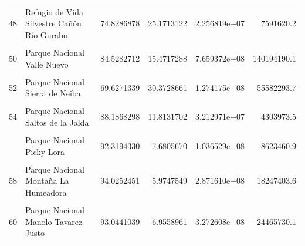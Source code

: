 \documentclass[10pt,landscape,a3paper]{article}
\begin{document}
\begin{longtable}[t]{llrrrr}
48 & Refugio de Vida Silvestre Cañón Río Gurabo & 74.8286878 & 25.1713122 & 2.256819e+07 & 7591620.2\\
\cellcolor{lightgray}{49} & \cellcolor{lightgray}{Refugio de Vida Silvestre Bahia de Luperón} & \cellcolor{lightgray}{43.6916900} & \cellcolor{lightgray}{56.3083100} & \cellcolor{lightgray}{8.163662e+06} & \cellcolor{lightgray}{10521039.6}\\
50 & Parque Nacional Valle Nuevo & 84.5282712 & 15.4717288 & 7.659372e+08 & 140194190.1\\
\addlinespace
\cellcolor{lightgray}{51} & \cellcolor{lightgray}{Parque Nacional Sierra Martín García} & \cellcolor{lightgray}{72.8168067} & \cellcolor{lightgray}{27.1831933} & \cellcolor{lightgray}{1.904179e+08} & \cellcolor{lightgray}{71084794.4}\\
52 & Parque Nacional Sierra de Neiba & 69.6271339 & 30.3728661 & 1.274175e+08 & 55582293.7\\
\cellcolor{lightgray}{53} & \cellcolor{lightgray}{Parque Nacional Sierra de Bahoruco} & \cellcolor{lightgray}{88.1011026} & \cellcolor{lightgray}{11.8988974} & \cellcolor{lightgray}{9.623023e+08} & \cellcolor{lightgray}{129968135.2}\\
54 & Parque Nacional Saltos de la Jalda & 88.1868298 & 11.8131702 & 3.212971e+07 & 4303973.5\\
\cellcolor{lightgray}{55} & \cellcolor{lightgray}{Parque Nacional Punta Espada} & \cellcolor{lightgray}{49.9096730} & \cellcolor{lightgray}{50.0903270} & \cellcolor{lightgray}{4.104462e+07} & \cellcolor{lightgray}{41193188.6}\\
\addlinespace
56 & Parque Nacional Picky Lora & 92.3194330 & 7.6805670 & 1.036529e+08 & 8623460.9\\
\cellcolor{lightgray}{57} & \cellcolor{lightgray}{Parque Nacional Nalga de Maco} & \cellcolor{lightgray}{82.6462447} & \cellcolor{lightgray}{17.3537553} & \cellcolor{lightgray}{1.370679e+08} & \cellcolor{lightgray}{28781005.0}\\
58 & Parque Nacional Montaña La Humeadora & 94.0252451 & 5.9747549 & 2.871610e+08 & 18247403.6\\
\cellcolor{lightgray}{59} & \cellcolor{lightgray}{Parque Nacional Máximo Gómez} & \cellcolor{lightgray}{76.1949505} & \cellcolor{lightgray}{23.8050495} & \cellcolor{lightgray}{3.222647e+07} & \cellcolor{lightgray}{10068289.4}\\
60 & Parque Nacional Manolo Tavarez Justo & 93.0441039 & 6.9558961 & 3.272608e+08 & 24465730.1\\

\end{longtable}
\end{document}
